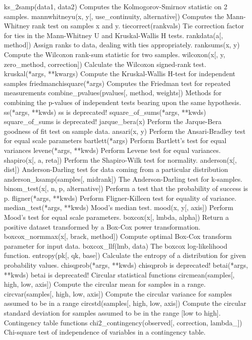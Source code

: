 ks_2samp(data1, data2)	Computes the Kolmogorov-Smirnov statistic on 2 samples.
mannwhitneyu(x, y[, use_continuity, alternative])	Computes the Mann-Whitney rank test on samples x and y.
tiecorrect(rankvals)	Tie correction factor for ties in the Mann-Whitney U and Kruskal-Wallis H tests.
rankdata(a[, method])	Assign ranks to data, dealing with ties appropriately.
ranksums(x, y)	Compute the Wilcoxon rank-sum statistic for two samples.
wilcoxon(x[, y, zero_method, correction])	Calculate the Wilcoxon signed-rank test.
kruskal(*args, **kwargs)	Compute the Kruskal-Wallis H-test for independent samples
friedmanchisquare(*args)	Computes the Friedman test for repeated measurements
combine_pvalues(pvalues[, method, weights])	Methods for combining the p-values of independent tests bearing upon the same hypothesis.
ss(*args, **kwds)	ss is deprecated!
square_of_sums(*args, **kwds)	square_of_sums is deprecated!
jarque_bera(x)	Perform the Jarque-Bera goodness of fit test on sample data.
ansari(x, y)	Perform the Ansari-Bradley test for equal scale parameters
bartlett(*args)	Perform Bartlett’s test for equal variances
levene(*args, **kwds)	Perform Levene test for equal variances.
shapiro(x[, a, reta])	Perform the Shapiro-Wilk test for normality.
anderson(x[, dist])	Anderson-Darling test for data coming from a particular distribution
anderson_ksamp(samples[, midrank])	The Anderson-Darling test for k-samples.
binom_test(x[, n, p, alternative])	Perform a test that the probability of success is p.
fligner(*args, **kwds)	Perform Fligner-Killeen test for equality of variance.
median_test(*args, **kwds)	Mood’s median test.
mood(x, y[, axis])	Perform Mood’s test for equal scale parameters.
boxcox(x[, lmbda, alpha])	Return a positive dataset transformed by a Box-Cox power transformation.
boxcox_normmax(x[, brack, method])	Compute optimal Box-Cox transform parameter for input data.
boxcox_llf(lmb, data)	The boxcox log-likelihood function.
entropy(pk[, qk, base])	Calculate the entropy of a distribution for given probability values.
chisqprob(*args, **kwds)	chisqprob is deprecated!
betai(*args, **kwds)	betai is deprecated!
Circular statistical functions
circmean(samples[, high, low, axis])	Compute the circular mean for samples in a range.
circvar(samples[, high, low, axis])	Compute the circular variance for samples assumed to be in a range
circstd(samples[, high, low, axis])	Compute the circular standard deviation for samples assumed to be in the range [low to high].
Contingency table functions
chi2_contingency(observed[, correction, lambda_])	Chi-square test of independence of variables in a contingency table.
